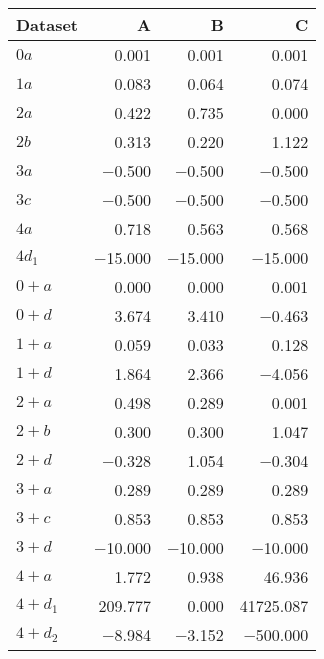 \begin{tabular}{lrrr}
\toprule
 Dataset   &       A &       B &         C \\
\midrule
 $0 a$     &   \num{0.001} &   \num{0.001} &     \num{0.001} \\
 $1 a$     &   \num{0.083} &   \num{0.064} &     \num{0.074} \\
 $2 a$     &   \num{0.422} &   \num{0.735} &     \num{0.000} \\
 $2 b$     &   \num{0.313} &   \num{0.220} &     \num{1.122} \\
 $3 a$     &  \num{-0.500} &  \num{-0.500} &    \num{-0.500} \\
 $3 c$     &  \num{-0.500} &  \num{-0.500} &    \num{-0.500} \\
 $4 a$     &   \num{0.718} &   \num{0.563} &     \num{0.568} \\
 $4 d_1$   & \num{-15.000} & \num{-15.000} &   \num{-15.000} \\
 $0+ a$    &   \num{0.000} &   \num{0.000} &     \num{0.001} \\
 $0+ d$    &   \num{3.674} &   \num{3.410} &    \num{-0.463} \\
 $1+ a$    &   \num{0.059} &   \num{0.033} &     \num{0.128} \\
 $1+ d$    &   \num{1.864} &   \num{2.366} &    \num{-4.056} \\
 $2+ a$    &   \num{0.498} &   \num{0.289} &     \num{0.001} \\
 $2+ b$    &   \num{0.300} &   \num{0.300} &     \num{1.047} \\
 $2+ d$    &  \num{-0.328} &   \num{1.054} &    \num{-0.304} \\
 $3+ a$    &   \num{0.289} &   \num{0.289} &     \num{0.289} \\
 $3+ c$    &   \num{0.853} &   \num{0.853} &     \num{0.853} \\
 $3+ d$    & \num{-10.000} & \num{-10.000} &   \num{-10.000} \\
 $4+ a$    &   \num{1.772} &   \num{0.938} &    \num{46.936} \\
 $4+ d_1$  & \num{209.777} &   \num{0.000} & \num{41725.087} \\
 $4+ d_2$  &  \num{-8.984} &  \num{-3.152} &  \num{-500.000} \\
\bottomrule
\end{tabular}